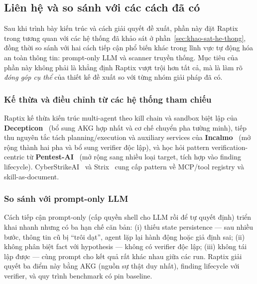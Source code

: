 
\subsection{Liên hệ và so sánh với các cách đã có}
\label{sec:lien-he-so-sanh}

Sau khi trình bày kiến trúc và cách giải quyết đề xuất, phần này đặt Raptix trong tương quan với các hệ thống đã khảo sát ở phần~\ref{sec:khao-sat-he-thong}, đồng thời so sánh với hai cách tiếp cận phổ biến khác trong lĩnh vực tự động hóa an toàn thông tin: prompt-only LLM và scanner truyền thống. Mục tiêu của phần này không phải là khẳng định Raptix vượt trội hơn tất cả, mà là làm rõ \emph{đóng góp cụ thể} của thiết kế đề xuất so với từng nhóm giải pháp đã có.

\subsubsection*{Kế thừa và điều chỉnh từ các hệ thống tham chiếu}

Raptix kế thừa kiến trúc multi-agent theo kill chain và sandbox biệt lập của \textbf{Decepticon}~\cite{decepticon} (bổ sung AKG hợp nhất và cơ chế chuyển pha tường minh), tiếp thu nguyên tắc tách planning/execution và auxiliary services của \textbf{Incalmo}~\cite{incalmo} (mở rộng thành hai pha và bổ sung verifier độc lập), và học hỏi pattern verification-centric từ \textbf{Pentest-AI}~\cite{pentestai} (mở rộng sang nhiều loại target, tích hợp vào finding lifecycle). CyberStrikeAI~\cite{cyberstrike} và Strix~\cite{strix} cung cấp pattern về MCP/tool registry và skill-as-document.

\subsubsection*{So sánh với prompt-only LLM}

Cách tiếp cận prompt-only (cấp quyền shell cho LLM rồi để tự quyết định) triển khai nhanh nhưng có ba hạn chế căn bản: (i) thiếu state persistence — sau nhiều bước, thông tin cũ bị ``trôi dạt'', agent lặp lại hành động hoặc giả định sai; (ii) không phân biệt fact với hypothesis — không có verifier độc lập; (iii) không tái lập được — cùng prompt cho kết quả rất khác nhau giữa các run. Raptix giải quyết ba điểm này bằng AKG (nguồn sự thật duy nhất), finding lifecycle với verifier, và quy trình benchmark có pin baseline.

